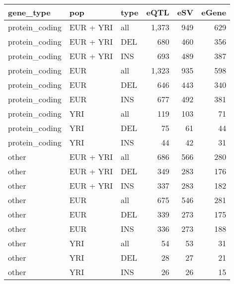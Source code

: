 
\begin{tabular}{l|l|l|r|r|r}
\hline
gene\_type & pop & type & eQTL & eSV & eGene\\
\hline
protein\_coding & EUR + YRI & all & 1,373 & 949 & 629\\
\hline
protein\_coding & EUR + YRI & DEL & 680 & 460 & 356\\
\hline
protein\_coding & EUR + YRI & INS & 693 & 489 & 387\\
\hline
protein\_coding & EUR & all & 1,323 & 935 & 598\\
\hline
protein\_coding & EUR & DEL & 646 & 443 & 340\\
\hline
protein\_coding & EUR & INS & 677 & 492 & 381\\
\hline
protein\_coding & YRI & all & 119 & 103 & 71\\
\hline
protein\_coding & YRI & DEL & 75 & 61 & 44\\
\hline
protein\_coding & YRI & INS & 44 & 42 & 31\\
\hline
other & EUR + YRI & all & 686 & 566 & 280\\
\hline
other & EUR + YRI & DEL & 349 & 283 & 176\\
\hline
other & EUR + YRI & INS & 337 & 283 & 182\\
\hline
other & EUR & all & 675 & 546 & 281\\
\hline
other & EUR & DEL & 339 & 273 & 175\\
\hline
other & EUR & INS & 336 & 273 & 188\\
\hline
other & YRI & all & 54 & 53 & 31\\
\hline
other & YRI & DEL & 28 & 27 & 21\\
\hline
other & YRI & INS & 26 & 26 & 15\\
\hline
\end{tabular}